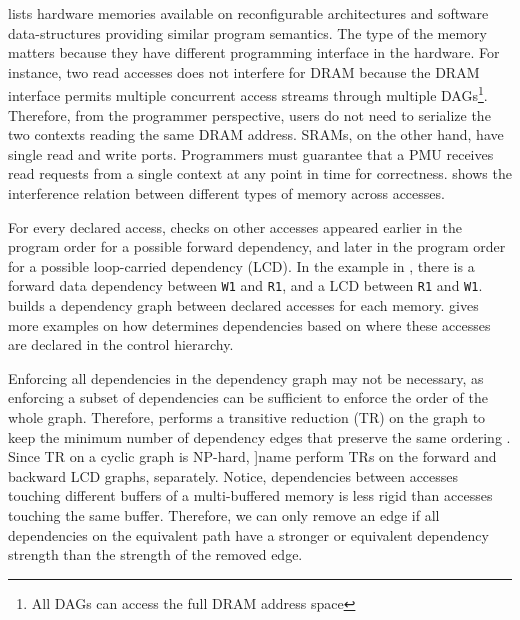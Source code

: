  lists hardware memories available on reconfigurable architectures and software
data-structures providing similar program semantics.
The type of the memory matters because they have different programming interface in the hardware.
For instance, two read accesses does not interfere for DRAM because the DRAM interface permits
multiple concurrent access streams through multiple DAGs\footnote{All DAGs can access the full DRAM
address space}. 
Therefore, from the programmer perspective, users do not need
to serialize the two contexts reading the same DRAM address. 
SRAMs, on the other hand, have single read 
and write ports. Programmers must guarantee that a PMU receives read requests from a single context
at any point in time for correctness.
 shows the interference relation between different types of memory across
accesses.

For every declared access, \name{} checks on other accesses appeared earlier in the program order
for a possible forward dependency, and later in the program order for a possible loop-carried dependency (LCD). 
In the example in , there is a forward data dependency between \texttt{W1} and
\texttt{R1}, and a LCD between \texttt{R1} and \texttt{W1}. 
\name builds a dependency graph between declared accesses for each memory.
\todo{} gives more examples on how \name
determines dependencies based on where these accesses are declared in the control hierarchy.

Enforcing all dependencies in the dependency graph may not be necessary, as enforcing a subset of
dependencies can be sufficient to enforce the order of the whole graph.
Therefore, \name performs a transitive reduction (TR) on the graph to keep the minimum number of dependency edges 
that preserve the same ordering \cite{tr}.
Since TR on a cyclic graph is NP-hard, ]name perform TRs on the forward and backward LCD graphs, separately.
Notice, dependencies between accesses touching different buffers of a multi-buffered memory is less rigid 
than accesses touching the same buffer.
Therefore, we can only remove an edge if all dependencies on the equivalent path have a stronger or equivalent 
dependency strength than the strength of the removed edge.


